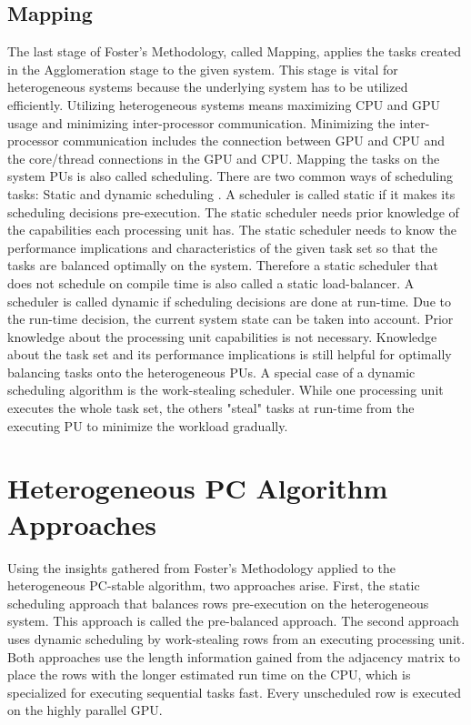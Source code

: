 \subsection{Mapping}
The last stage of Foster's Methodology, called Mapping, applies the tasks created in the Agglomeration stage to the given system. This stage is vital for heterogeneous systems because the underlying system has to be utilized efficiently. Utilizing heterogeneous systems means maximizing CPU and GPU usage and minimizing inter-processor communication. Minimizing the inter-processor communication includes the connection between GPU and CPU and the core/thread connections in the GPU and CPU.
Mapping the tasks on the system PUs is also called scheduling. There are two common ways of scheduling tasks: Static and dynamic scheduling \cite{kopetzRealTimeScheduling1997}.
A scheduler is called static if it makes its scheduling decisions pre-execution. The static scheduler needs prior knowledge of the capabilities each processing unit has. The static scheduler needs to know the performance implications and characteristics of the given task set so that the tasks are balanced optimally on the system. Therefore a static scheduler that does not schedule on compile time is also called a static load-balancer.
A scheduler is called dynamic if scheduling decisions are done at run-time. Due to the run-time decision, the current system state can be taken into account. Prior knowledge about the processing unit capabilities is not necessary. Knowledge about the task set and its performance implications is still helpful for optimally balancing tasks onto the heterogeneous PUs.
A special case of a dynamic scheduling algorithm is the work-stealing scheduler. While one processing unit executes the whole task set, the others "steal" tasks at run-time from the executing PU to minimize the workload gradually.

\section{Heterogeneous PC Algorithm Approaches}
Using the insights gathered from Foster's Methodology applied to the heterogeneous PC-stable algorithm, two approaches arise. First, the static scheduling approach that balances rows pre-execution on the heterogeneous system. This approach is called the pre-balanced approach. The second approach uses dynamic scheduling by work-stealing rows from an executing processing unit. Both approaches use the length information gained from the adjacency matrix to place the rows with the longer estimated run time on the CPU, which is specialized for executing sequential tasks fast. Every unscheduled row is executed on the highly parallel GPU.

